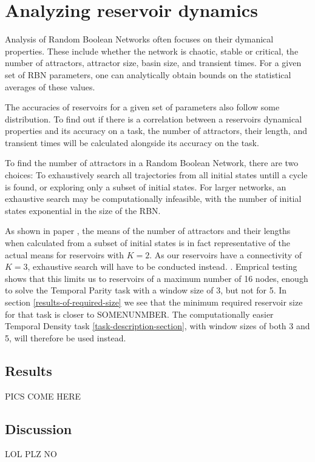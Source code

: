 \section{Analyzing reservoir dynamics}

Analysis of Random Boolean Networks often focuses on their dymanical properties.
These include whether the network is chaotic, stable or critical,
the number of attractors, attractor size, basin size, and transient times.
For a given set of RBN parameters, one can analytically obtain bounds on the statistical averages of these values.

The accuracies of reservoirs for a given set of parameters also follow some distribution.
To find out if there is a correlation between a reservoirs dynamical properties and its accuracy on a task,
the number of attractors, their length, and transient times will be calculated alongside its accuracy on the task.

To find the number of attractors in a Random Boolean Network, there are two choices:
To exhaustively search all trajectories from all initial states untill a cycle is found,
or exploring only a subset of initial states.
For larger networks, an exhaustive search may be computationally infeasible,
with the number of initial states exponential in the size of the RBN.

As shown in paper ,
the means of the number of attractors and their lengths when calculated from a subset of initial states is in fact representative of the actual means for reservoirs with $K=2$.
As our reservoirs have a connectivity of $K = 3$, exhaustive search will have to be conducted instead.
.
Emprical testing shows that this limits us to reservoirs of a maximum number of 16 nodes,
enough to solve the Temporal Parity task with a window size of 3, but not for 5.
In section \ref{results-of-required-size} we see that the minimum required reservoir size for that task is closer to SOMENUNMBER.
The computationally easier Temporal Density task \ref{task-description-section},
with window sizes of both 3 and 5,
will therefore be used instead.


\subsection{Results}

PICS COME HERE

\subsection{Discussion}

LOL PLZ NO
